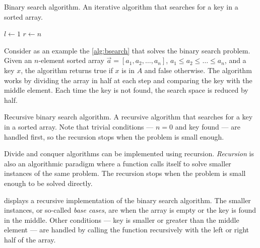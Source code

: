 \begin{algorithm}
  \caption{Binary search algorithm.  An iterative algorithm that searches for a key in a sorted array.}
  \label{alg:bsearch}
  $l \gets 1$\;
  $r \gets n$\;
\end{algorithm}

Consider as an example the \cref{alg:bsearch} that solves the binary search problem.  Given an
$n$-element sorted array $\vec{a} = \left[a_1, a_2, \dots, a_n\right]$, $a_1 \leq a_2 \leq
\dots \leq a_n$, and a key $x$, the algorithm returns true if $x$ is in $A$ and false
otherwise.  The algorithm works by dividing the array in half at each step and comparing
the key with the middle element.  Each time the key is not found, the search space is
reduced by half.

\begin{algorithm}
  \caption{
    Recursive binary search algorithm.
    A recursive algorithm that searches for a key in a sorted array.  Note that trivial
    conditions --- $n = 0$ and key found --- are handled first, so the recursion stops
    when the problem is small enough.
  }
  \label{alg:bsearch2}
\end{algorithm}

Divide and conquer algorithms can be implemented using recursion.  \emph{Recursion}
is also an algorithmic paradigm where a function calls itself to solve smaller instances of the
same problem.  The recursion stops when the problem is small enough to be solved directly.

 displays a recursive implementation of the binary search algorithm.
The smaller instances, or so-called \emph{base cases}, are when the array is empty or the key
is found in the middle.  Other conditions --- key is smaller or greater than the middle element ---
are handled by calling the function recursively with the left or right half of the array.

